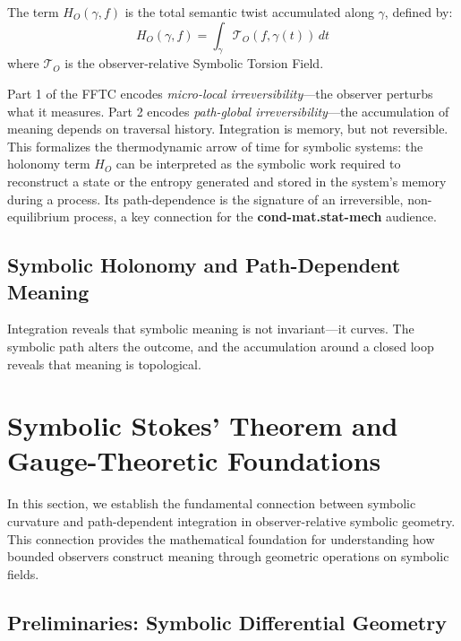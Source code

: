 \begin{definition}
\label{definition:bk4_symbolic_holonomy_term}
The term $H_O(\gamma, f)$ is the total semantic twist accumulated along $\gamma$, defined by:
\[
H_O(\gamma, f) = \int_\gamma \mathcal{T}_O(f, \gamma(t)) \, dt
\]
where $\mathcal{T}_O$ is the observer-relative Symbolic Torsion Field.
\end{definition}

\begin{scholium}
\label{schlium:bk4_micro_local_vs_path_global_irreversibility}
Part 1 of the FFTC encodes \emph{micro-local irreversibility}—the observer perturbs what it measures. Part 2 encodes \emph{path-global irreversibility}—the accumulation of meaning depends on traversal history. Integration is memory, but not reversible. This formalizes the thermodynamic arrow of time for symbolic systems: the holonomy term $H_O$ can be interpreted as the symbolic work required to reconstruct a state or the entropy generated and stored in the system's memory during a process. Its path-dependence is the signature of an irreversible, non-equilibrium process, a key connection for the \textbf{cond-mat.stat-mech} audience.
\end{scholium}

\subsection{Symbolic Holonomy and Path-Dependent Meaning}
\label{subsec:bk4_symbolic_holonomy_theorem}

Integration reveals that symbolic meaning is not invariant—it curves. The symbolic path alters the outcome, and the accumulation around a closed loop reveals that meaning is topological.

\section{Symbolic Stokes' Theorem and Gauge-Theoretic Foundations}

In this section, we establish the fundamental connection between symbolic curvature and path-dependent integration in observer-relative symbolic geometry. This connection provides the mathematical foundation for understanding how bounded observers construct meaning through geometric operations on symbolic fields.

\subsection{Preliminaries: Symbolic Differential Geometry}

